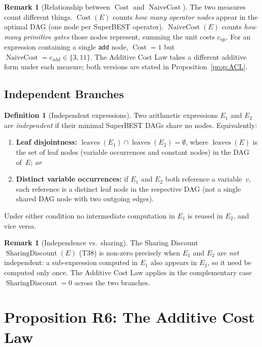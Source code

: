 \documentclass[12pt,a4paper]{article}
\theoremstyle{definition}
\newtheorem{definition}[theorem]{Definition}
\newtheorem{remark}[theorem]{Remark}
\newcommand{\Cost}{\operatorname{Cost}}
\newcommand{\NC}{\operatorname{NaiveCost}}
\newcommand{\SD}{\operatorname{SharingDiscount}}
\newcommand{\leaves}{\operatorname{leaves}}
\begin{document}
\begin{remark}[Relationship between $\Cost$ and $\NC$]
\label{rem:CostVsNC}
The two measures count different things.  $\Cost(E)$ counts \emph{how many
operator nodes} appear in the optimal DAG (one node per SuperBEST operator).
$\NC(E)$ counts \emph{how many primitive gates} those nodes represent, summing
the unit costs $c_{\mathrm{op}}$.  For an expression containing a single
\texttt{add} node, $\Cost = 1$ but $\NC = c_{\mathrm{add}} \in \{3, 11\}$.  The
Additive Cost Law takes a different additive form under each measure; both
versions are stated in Proposition~\ref{prop:ACL}.
\end{remark}

\subsection{Independent Branches}

\begin{definition}[Independent expressions]
\label{def:independent}
Two arithmetic expressions $E_1$ and $E_2$ are \emph{independent} if their
minimal SuperBEST DAGs share no nodes.  Equivalently:
\begin{enumerate}
  \item \textbf{Leaf disjointness:} $\leaves(E_1) \cap \leaves(E_2) = \emptyset$,
        where $\leaves(E)$ is the set of leaf nodes (variable occurrences and
        constant nodes) in the DAG of~$E$; \emph{or}
  \item \textbf{Distinct variable occurrences:} if $E_1$ and $E_2$ both
        reference a variable~$v$, each reference is a distinct leaf node in the
        respective DAG (not a single shared DAG node with two outgoing edges).
\end{enumerate}
Under either condition no intermediate computation in $E_1$ is reused in
$E_2$, and vice versa.
\end{definition}

\begin{remark}[Independence vs.\ sharing]
\label{rem:sharing}
The Sharing Discount $\SD(E)$ (T38) is non-zero precisely when $E_1$ and $E_2$
are \emph{not} independent: a sub-expression computed in $E_1$ also appears in
$E_2$, so it need be computed only once.  The Additive Cost Law applies in the
complementary case $\SD = 0$ across the two branches.
\end{remark}

\section{Proposition R6: The Additive Cost Law}
\label{sec:ACL}
\end{document}
